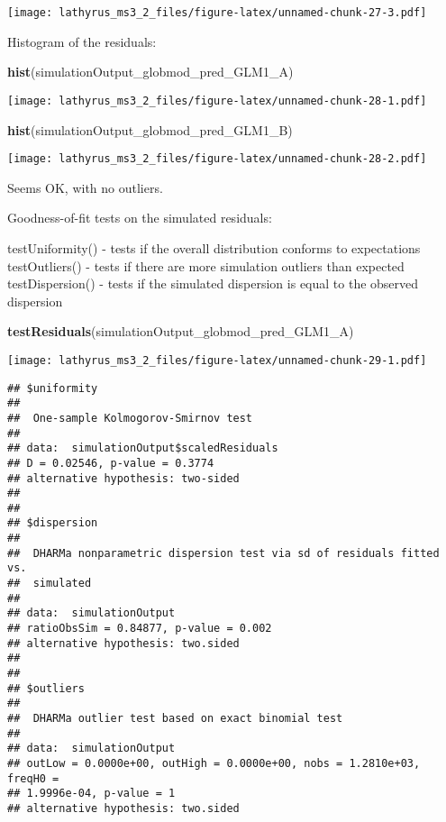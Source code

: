 \documentclass[
]{article}
\newenvironment{Shaded}{\begin{snugshade}}{\end{snugshade}}
\newcommand{\KeywordTok}[1]{\textcolor[rgb]{0.13,0.29,0.53}{\textbf{#1}}}
\newcommand{\NormalTok}[1]{#1}
\begin{document}
\texttt{[image: lathyrus\_ms3\_2\_files/figure-latex/unnamed-chunk-27-3.pdf]}

Histogram of the residuals:

\begin{Shaded}
\begin{Highlighting}[]
\KeywordTok{hist}\NormalTok{(simulationOutput_globmod_pred_GLM1_A)}
\end{Highlighting}
\end{Shaded}

\texttt{[image: lathyrus\_ms3\_2\_files/figure-latex/unnamed-chunk-28-1.pdf]}

\begin{Shaded}
\begin{Highlighting}[]
\KeywordTok{hist}\NormalTok{(simulationOutput_globmod_pred_GLM1_B)}
\end{Highlighting}
\end{Shaded}

\texttt{[image: lathyrus\_ms3\_2\_files/figure-latex/unnamed-chunk-28-2.pdf]}

Seems OK, with no outliers.

Goodness-of-fit tests on the simulated residuals:

testUniformity() - tests if the overall distribution conforms to
expectations testOutliers() - tests if there are more simulation
outliers than expected testDispersion() - tests if the simulated
dispersion is equal to the observed dispersion

\begin{Shaded}
\begin{Highlighting}[]
\KeywordTok{testResiduals}\NormalTok{(simulationOutput_globmod_pred_GLM1_A)}
\end{Highlighting}
\end{Shaded}

\texttt{[image: lathyrus\_ms3\_2\_files/figure-latex/unnamed-chunk-29-1.pdf]}

\begin{verbatim}
## $uniformity
## 
##  One-sample Kolmogorov-Smirnov test
## 
## data:  simulationOutput$scaledResiduals
## D = 0.02546, p-value = 0.3774
## alternative hypothesis: two-sided
## 
## 
## $dispersion
## 
##  DHARMa nonparametric dispersion test via sd of residuals fitted vs.
##  simulated
## 
## data:  simulationOutput
## ratioObsSim = 0.84877, p-value = 0.002
## alternative hypothesis: two.sided
## 
## 
## $outliers
## 
##  DHARMa outlier test based on exact binomial test
## 
## data:  simulationOutput
## outLow = 0.0000e+00, outHigh = 0.0000e+00, nobs = 1.2810e+03, freqH0 =
## 1.9996e-04, p-value = 1
## alternative hypothesis: two.sided
\end{verbatim}
\end{document}
